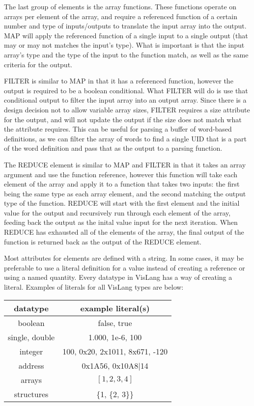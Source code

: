 The last group of elements is the array functions. These functions operate on
arrays per element of the array, and require a referenced function of a certain
number and type of inputs/outputs to translate the input array into the output.
MAP will apply the referenced function of a single input to a single output
(that may or may not matches the input's type). What is important is that the input
array's type and the type of the input to the function match, as well as the
same criteria for the output.

FILTER is similar to MAP in that it has a referenced function, however the output is
required to be a boolean conditional. What FILTER will do is use that conditional
output to filter the input array into an output array. Since there is a design
decision not to allow variable array sizes, FILTER requires a size attribute for
the output, and will not update the output if the size does not match what the
attribute requires. This can be useful for parsing a buffer of word-based definitions,
as we can filter the array of words to find a single UID that is a part of the word
definition and pass that as the output to a parsing function.

The REDUCE element is similar to MAP and FILTER in that it takes an array
argument and use the function reference, however this function will take each
element of the array and apply it to a function that takes two inputs: the first
being the same type as each array element, and the second matching the output type
of the function. REDUCE will start with the first element and the initial value
for the output and recursively run through each element of the array, feeding back
the output as the inital value input for the next iteration. When REDUCE has
exhausted all of the elements of the array, the final output of the function
is returned back as the output of the REDUCE element.

Most attributes for elements are defined with a string. In some cases, it may be 
preferable to use a literal definition for a value instead of creating a reference
or using a named quantity. Every datatype in VisLang has a way of creating a literal.
Examples of literals for all VisLang types are below:
\begin{longtable}[c]{ |c|c| } 
    \hline
    datatype & example literal(s) \\ 
    \hline\hline
    boolean & false, true \\
    single, double & 1.000, 1e-6, 100 \\
    integer & 100, 0x20, 2x1011, 8x671, -120 \\ 
    \hline
    address & 0x1A56, 0x10A8$\vert$14 \\
    arrays & $[1, 2, 3, 4]$ \\
    structures & \{1, \{2, 3\}\} \\
    \hline
\end{longtable}

